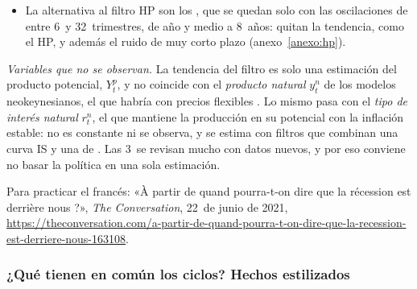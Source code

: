 \documentclass[11pt]{article}
\begin{document}
\begin{itemize}
\item La alternativa al filtro HP son los , que se quedan solo con las oscilaciones de entre 6~y 32~trimestres, de año y medio a 8~años: quitan la tendencia, como el HP, y además el ruido de muy corto plazo\nocite{BaxterKing1999Measuring,ChristianoFitzgerald2003Band} (anexo~\ref{anexo:hp}).
\end{itemize}

\begin{anotaciones}
\emph{Variables que no se observan.} La tendencia del filtro es solo una estimación del producto potencial, $Y^p_t$, y no coincide con el \emph{producto natural} $y^n_t$ de los modelos neokeynesianos, el que habría con precios flexibles . Lo mismo pasa con el \emph{tipo de interés natural} $r^n_t$, el que mantiene la producción en su potencial con la inflación estable: no es constante ni se observa, y se estima con filtros que combinan una curva IS y una de \nocite{LaubachWilliams2003,HolstonLaubachWilliams2017Measuring} . Las 3~se revisan mucho con datos nuevos, y por eso conviene no basar la política en una sola estimación.

Para practicar el francés: «À partir de quand pourra-t-on dire que la récession est derrière nous ?», \emph{The Conversation}, 22~de junio de 2021, \url{https://theconversation.com/a-partir-de-quand-pourra-t-on-dire-que-la-recession-est-derriere-nous-163108}.
\end{anotaciones}

\subsubsection{¿Qué tienen en común los ciclos? Hechos estilizados}\label{sec:hechos-ciclo}
\end{document}
